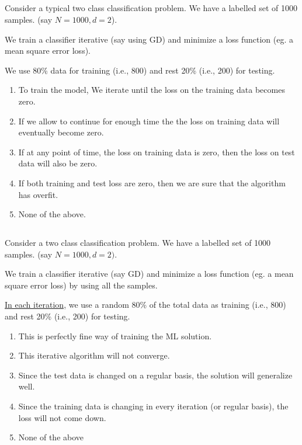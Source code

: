 \begin{frame}
\section{}
Consider a typical two class classification problem. We have a labelled set of 1000 samples. (say $N=1000, d=2$).

We train a classifier iterative (say using GD) and minimize a loss function (eg. a mean square error loss).

We use 80\% data for training (i.e., 800) and rest 20\% (i.e., 200) for testing.
\begin{enumerate}
\item To train the model, We iterate until the loss on the training data becomes zero.
\item If we allow to continue for enough time the the loss on training data will eventually become zero.
\item If at any point of time, the loss on training data is zero, then the loss on test data will also be zero.
\item If both training and test loss are zero, then we are sure that the algorithm has overfit.
\item None of the above.   %
\end{enumerate}
\end{frame}

\begin{frame}
\section{}
Consider a two class classification problem. We have a labelled set of 1000 samples. (say $N=1000, d=2)$.

We train a classifier iterative (say GD) and minimize a loss function (eg. a mean square error loss) by using all the samples.


\underline {In each iteration,} we use  a random
80\% of the total data as training (i.e., 800) and rest 20\% (i.e., 200) for testing.
\begin{enumerate}
\item This is perfectly fine way of training the ML solution.
\item This iterative algorithm will not converge.
\item Since the test data is changed on a regular basis, the solution will generalize well.
\item Since the training data is changing in every iteration (or regular basis), the loss will not come down.
\item None of the above     %
\end{enumerate}
\end{frame}

